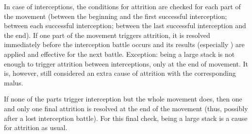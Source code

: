 In case of interceptions, the conditions for attrition are checked for each
part of the movement (between the beginning and the first successful
interception; between each successful interception; between the last
successful interception and the end). If one part of the movement triggers
attrition, it is resolved immediately before the interception battle occurs
and its results (especially ) are applied and effective for
the next battle. Exception: being a large stack is not enough to trigger
attrition between interceptions, only at the end of movement. It is, however,
still considered an extra cause of attrition with the corresponding malus.

If none of the parts trigger interception but the whole movement does, then
one and only one final attrition is resolved at the end of the movement (thus,
possibly after a lost interception battle). For this final check, being a
large stack is a cause for attrition as usual.

